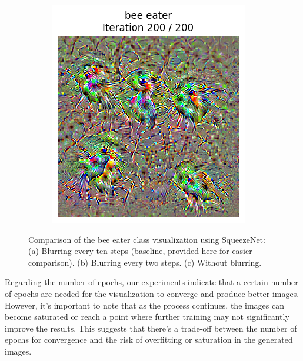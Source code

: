 \begin{figure}[H]
\begin{subfigure}[t]{.33\textwidth}
        \caption{}
        \label{fig:class_viz_blur:sub2}
    \end{subfigure}%
    \begin{subfigure}[t]{.33\textwidth}
        \centering
        \includegraphics[width=\linewidth]{figs_propre2/SqueezeNet/SqueezeNet_bird_animated_no_blur_last_frame.png}
        \caption{}
        \label{fig:class_viz_blur:sub3}
    \end{subfigure}
    \caption{Comparison of the bee eater class visualization using SqueezeNet: (a) Blurring every ten steps (baseline, provided here for easier comparison). (b) Blurring every two steps. (c) Without blurring.} %
    \label{fig:class_viz_blur}
\end{figure}


Regarding the number of epochs, our experiments indicate that a certain number of epochs are needed for the visualization to converge and produce better images. However, it's important to note that as the process continues, the images can become saturated or reach a point where further training may not significantly improve the results. This suggests that there's a trade-off between the number of epochs for convergence and the risk of overfitting or saturation in the generated images.

